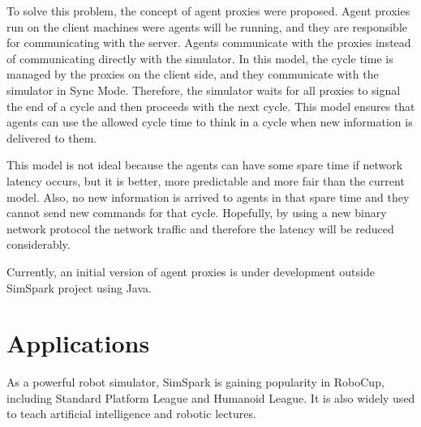 \documentclass{llncs}
\begin{document}
To solve this problem, the concept of agent proxies were proposed. Agent proxies
run on the client machines were agents will be running, and they are responsible for
communicating with the server. Agents communicate with the proxies instead of 
communicating directly with the simulator. In this model, the cycle time is managed
by the proxies on the client side, and they communicate with the simulator in Sync Mode.
Therefore, the simulator waits for all proxies to signal the end of a cycle and 
then proceeds with the next cycle. This model ensures that agents can use the allowed
cycle time to think in a cycle when new information is delivered to them. 

This model is not ideal because the agents can have some spare time if network latency
occurs, but it is better, more predictable and more fair than the current model. Also,
no new information is arrived to agents in that spare time and they cannot send new 
commands for that cycle. Hopefully, by using a new binary network protocol the network 
traffic and therefore the latency will be reduced considerably.

Currently, an initial version of agent proxies is under development outside SimSpark
project using Java.




\section{Applications}
As a powerful robot simulator, SimSpark is gaining popularity in RoboCup, including Standard Platform League and Humanoid League. It is also widely used to teach artificial intelligence and robotic lectures.
\end{document}
